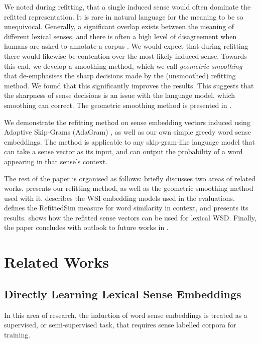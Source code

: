 \documentclass{article}
\def\parencite{\cite}
\begin{document}
We noted during refitting, that a single induced sense would often dominate the refitted representation. It is rare in natural language for the meaning to be so unequivocal. Generally, a significant overlap exists between the meaning of different lexical senses, and there is often a high level of disagreement when humans are asked to annotate a corpus \parencite{veronis1998study}.
We would expect that during refitting there would likewise be contention over the most likely induced sense.
Towards this end, we develop a smoothing method, which we call \emph{geometric smoothing} that de-emphasises the sharp decisions made by the (unsmoothed) refitting method. We found that this significantly improves the results. This suggests that the sharpness of sense decisions is an issue with the language model, which smoothing can correct. The geometric smoothing method is presented in .


We demonstrate the refitting method on sense embedding vectors induced using Adaptive Skip-Grams (AdaGram) \parencite{AdaGrams}, as well as our own simple greedy word sense embeddings. The method is applicable to any skip-gram-like language model that can take a sense vector as its input, and can output the probability of a word appearing in that sense's context.


The rest of the paper is organised as follows:  briefly discusses two areas of related works.  presents our refitting method, as well as the geometric smoothing method used with it.  describes the WSI embedding models used in the evaluations.  defines the RefittedSim measure for word similarity in context, and presents its results.  shows how the refitted sense vectors can be used for lexical WSD. Finally, the paper concludes with outlook to future works in .

\section{Related Works} \label{relatedwords}

\subsection{Directly Learning Lexical Sense Embeddings}
In this area of research, the induction of word sense embeddings is treated as a supervised, or semi-supervised task, that requires sense labelled corpora for training.
\end{document}
